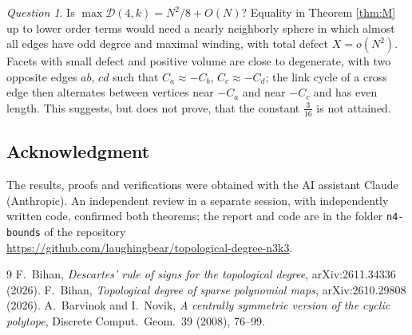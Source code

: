 \documentclass[11pt]{article}
\theoremstyle{remark}
\newtheorem{question}[theorem]{Question}
\begin{document}
\begin{question}
Is $\max\mathcal D(4,k)=N^2/8+O(N)$? Equality in Theorem \ref{thm:M} up to lower order terms would need a nearly neighborly sphere in which almost all edges have odd degree and maximal winding, with total defect $X=o(N^2)$. Facets with small defect and positive volume are close to degenerate, with two opposite edges $ab$, $cd$ such that $C_a\approx-C_b$, $C_c\approx-C_d$; the link cycle of a cross edge then alternates between vertices near $-C_a$ and near $-C_c$ and has even length. This suggests, but does not prove, that the constant $\tfrac3{16}$ is not attained.
\end{question}

\subsection*{Acknowledgment}
The results, proofs and verifications were obtained with the AI assistant Claude (Anthropic). An independent review in a separate session, with independently written code, confirmed both theorems; the report and code are in the folder \texttt{n4-bounds} of the repository\\ \url{https://github.com/laughingbear/topological-degree-n3k3}.

\begin{thebibliography}{9}
 F.~Bihan, \emph{Descartes' rule of signs for the topological degree}, arXiv:2611.34336 (2026).
 F.~Bihan, \emph{Topological degree of sparse polynomial maps}, arXiv:2610.29808 (2026).
 A.~Barvinok and I.~Novik, \emph{A centrally symmetric version of the cyclic polytope}, Discrete Comput.\ Geom.\ 39 (2008), 76--99.
\end{thebibliography}
\end{document}
